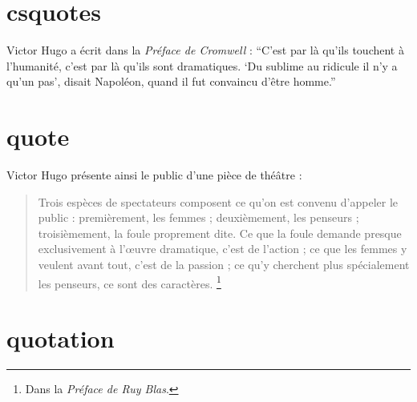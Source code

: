 \documentclass{article}
\begin{document}
\section{csquotes}


Victor Hugo a écrit dans la \emph{Préface de Cromwell} :
\enquote{C'est par là qu'ils touchent à l'humanité, c'est par là
qu'ils sont dramatiques. \enquote{Du sublime au ridicule il n'y a
qu'un pas}, disait Napoléon, quand il fut convaincu d'être homme.}


\section{quote}

%

Victor Hugo présente ainsi le public d'une pièce de théâtre :

\begin{quote}
Trois espèces de spectateurs composent ce qu'on est convenu
d'appeler le public : premièrement, les femmes ; deuxièmement,
les penseurs ; troisièmement, la foule proprement dite. Ce que
la foule demande presque exclusivement à l'œuvre dramatique,
c'est de l'action ; ce que les femmes y veulent avant tout,
c'est de la passion ; ce qu'y cherchent plus spécialement les
penseurs, ce sont des caractères.
\textelp{} \footnote{Dans la \emph{Préface de Ruy Blas}.}
\end{quote}


\section{quotation}

\end{document}
